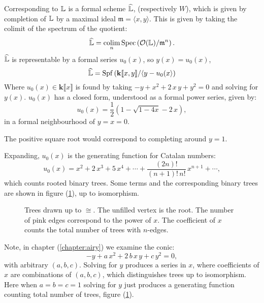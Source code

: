     Corresponding to \(\mathbb{L} \) is a formal scheme \( \widehat{\mathbb{L} \hspace{0pt} } \), (respectively \(W\)), which is given by completion of \(\mathbb{L} \) by a maximal ideal \( \mathfrak{m}=\langle x, y\rangle\). This is given by taking the colimit of the spectrum of the quotient: 
    \[ \widehat{\mathbb{L}} = \operatorname*{colim}_n  \mathrm{Spec} \left( \mathcal{O}(\mathbb{L} )/\mathfrak{m}^n \right). \]
    \( \widehat{\mathbb{L}}\) is representable by a formal series \(u_0(x)\), so \( y(x) =u_0(x)\), 
    \[ \widehat{\mathbb{L}} = \mathrm{Spf} \left(\mathbf{k}[\![ x,y]\!] /\langle y - u_{0}(x \rangle \right)\] 
    Where  \( u_0(x) \in \mathbf{k}\lBrack x \rBrack\) is found by taking \( -y + x^2 + 2 \,x\, y + y^2 = 0 \) and solving for \(y(x)\). \(u_0(x)\) has a closed form, understood as a formal power series, given by: 
    \[ u_0(x) = \frac{1}{2}\left( 1 - \sqrt{1-4x} - 2 \, x \right),\]
    in a formal neighbourhood of \(y=x=0\). 
    \begin{rem}
    The positive square root would correspond to completing around \(y=1\).
    \end{rem}
    Expanding, \( u_0(x)\) is the generating function for Catalan numbers:
    \[ u_0(x) = x^2 + 2\, x^3 + 5 \,x^4 + \cdots + \frac{(2n)!}{(n+1)!\,n!} \, x^{n+1}  + \cdots,\]
    which counts rooted binary trees. Some terms and the corresponding binary trees are shown in figure (\ref{fig:catalantrees}), up to isomorphism.
    \begin{figure}[htbp]
        \centering
        
        \caption{Trees drawn up to \( \cong\). The unfilled vertex is the root. The number of pink edges correspond to the power of \(x\). The coefficient of \(x\) counts the total number of trees with \(n\)-edges.}
        \label{fig:catalantrees}
    \end{figure}
    
    
    \begin{rem}
    Note, in chapter (\ref{chapter:airy}) we examine the conic:
    \[ - y + a \,x^2 + 2\, b\, x \,y + c\, y^2 = 0,\] 
    with arbitrary \((a,b,c)\). Solving for \(y\) produces a series in \(x\), where coefficients of \(x\) are combinations of \((a,b,c)\), which distinguishes trees up to isomorphism. Here when \(a=b=c=1\) solving for \(y\) just produces a generating function counting total number of trees, figure (\ref{fig:catalantrees}).
    \end{rem}
    

